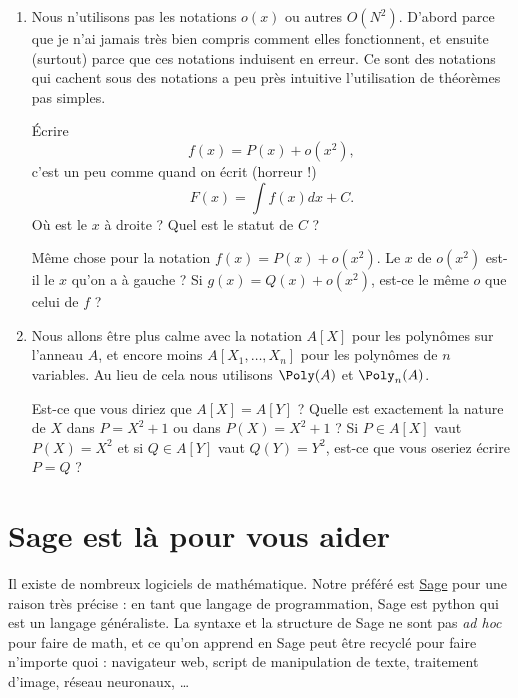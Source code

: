 \begin{enumerate}
    \item
        Nous n'utilisons pas les notations \( o(x)\) ou autres \( O(N^2)\). D'abord parce que je n'ai jamais très bien compris comment elles fonctionnent, et ensuite (surtout) parce que ces notations induisent en erreur. Ce sont des notations qui cachent sous des notations a peu près intuitive l'utilisation de théorèmes pas simples.

        Écrire
        \begin{equation}
            f(x)=P(x)+o(x^2),
        \end{equation}
        c'est un peu comme quand on écrit (horreur !)
        \begin{equation}
            F(x)=\int f(x)dx+C.
        \end{equation}
        Où est le \( x\) à droite ? Quel est le statut de \( C \) ? 

        Même chose pour la notation \( f(x)=P(x)+o(x^2)\). Le \( x\) de \( o(x^2)\) est-il le \( x\) qu'on a à gauche ? Si \( g(x)=Q(x)+o(x^2)\), est-ce le même \( o\) que celui de \( f\) ?
    \item
        Nous allons être plus calme avec la notation \( A[X]\) pour les polynômes sur l'anneau \( A\), et encore moins \( A[X_1,\ldots, X_n]\) pour les polynômes de \( n\) variables. Au lieu de cela nous utilisons \( \Poly(A)\) et \( \Poly_n(A)\).

        Est-ce que vous diriez que \( A[X]=A[Y]\) ? Quelle est exactement la nature de \( X\) dans \( P=X^2+1\) ou dans \( P(X)=X^2+1\) ? Si \( P\in A[X]\) vaut \( P(X)=X^2\)  et si \( Q\in A[Y]\) vaut \( Q(Y)=Y^2\), est-ce que vous oseriez écrire \( P=Q\) ?
\end{enumerate}

\section{Sage est là pour vous aider}

Il existe de nombreux logiciels de mathématique. Notre préféré est \href{http://www.sagemath.org}{Sage} pour une raison très précise : en tant que langage de programmation, Sage est python qui est un langage généraliste. La syntaxe et la structure de Sage ne sont pas \emph{ad hoc} pour faire de math, et ce qu'on apprend en Sage peut être recyclé pour faire n'importe quoi : navigateur web, script de manipulation de texte, traitement d'image, réseau neuronaux, \ldots

